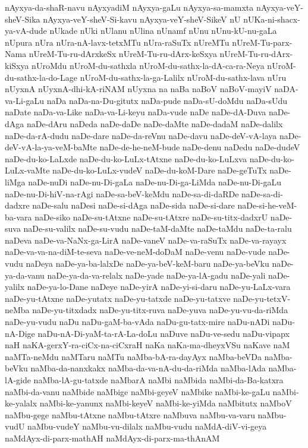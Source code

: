 {nAyxya-da-shaR-navu
nAyxyadiM
nAyxya-gaLu
nAyxya-sa-mamxta
nAyxya-veY-sheV-Sika
nAyxya-veY-sheV-Si-kavu
nAyxya-veY-sheV-SikeV
nU
nUKa-ni-shacx-ya-vA-dude
nUkade
nUki
nUlanu
nUlina
nUnamf
nUnu
nUnu-kU-nu-gaLa
nUpura
nUra
nUra-nA-lavx-tetxMTu
nUra-raSuTx
nUreMTu
nUreM-Tu-parx-Nama
nUreM-Tu-ru-dArxkeSx
nUreM-Tu-ru-dArx-keSxya
nUreM-Tu-ru-dArx-kiSxya
nUroMdu
nUroM-du-sathxla
nUroM-du-sathx-la-dA-ca-ra-Neya
nUroM-du-sathx-la-do-Lage
nUroM-du-sathx-la-ga-Lalilx
nUroM-du-sathx-lava
nUru
nUyxnA
nUyxnA-dhi-kA-riNAM
nUyxna
na
naBa
naBoV
naBoV-mayiV
naDA-va-Li-gaLu
naDa
naDa-na-Du-gitutx
naDa-pude
naDa-sU-doMdu
naDa-sUdu
naDate
naDa-va-Like
naDa-va-Li-keyu
naDa-vude
naDe
naDe-dA-Duva
naDe-dAga
naDe-dAru
naDeda
naDe-daDe
naDe-daMte
naDe-dadaM
naDe-dalilx
naDe-da-rA-dudu
naDe-dare
naDe-da-reVnu
naDe-davu
naDe-deV-vA-laya
naDe-deV-vA-la-ya-veM-baMte
naDe-de-he-neM-bude
naDe-denu
naDedu
naDe-dudeV
naDe-du-ko-LaLxde
naDe-du-ko-LuLx-tAtxne
naDe-du-ko-LuLxva
naDe-du-ko-LuLx-vaMte
naDe-du-ko-LuLx-vudeV
naDe-du-koM-Dare
naDe-geTuTx
naDe-liMga
naDe-nuDi
naDe-nu-Di-gaLa
naDe-nu-Di-ga-LiMda
naDe-nu-Di-gaLu
naDe-nu-Di-hiV-na-rAgi
naDe-sa-beV-keMdu
naDe-sa-di-daRDe
naDe-sa-di-dadxre
naDe-salu
naDesi
naDe-si-dAga
naDe-sida
naDe-si-dare
naDe-si-he-veM-ba-vara
naDe-siko
naDe-su-tAtxne
naDe-su-tAtxre
naDe-su-titx-dadxrU
naDe-suva
naDe-su-valilx
naDe-su-vudu
naDe-taM-daMte
naDe-taMdu
naDe-ta-ralu
naDeva
naDe-va-NaNx-ga-LirA
naDe-vaneV
naDe-va-raSuTx
naDe-va-rayayx
naDe-va-va-na-diM-te-seva
naDe-ve-neM-doDaM
naDe-venu
naDe-vude
naDe-vudu
naDeya
naDe-ya-ba-lalxDe
naDe-ya-beV-keM-baru
naDe-ya-beVku
naDe-ya-da-vanu
naDe-ya-da-va-relalx
naDe-yade
naDe-ya-lA-gadu
naDe-yali
naDe-yalilx
naDe-ya-lo-Dane
naDeye
naDe-yirA
naDe-yi-si-daru
naDe-yu-LaLx-vara
naDe-yu-tAtxne
naDe-yutatx
naDe-yu-tatxde
naDe-yu-tatxve
naDe-yu-tetxV-neMba
naDe-yu-titxdadx
naDe-yu-titx-ruva
naDe-yuva
naDe-yu-vu-da-riMda
naDe-yu-vudu
naDu
naDu-gaM-ba-vAda
naDu-gu-tatx-mire
naDu-nADi
naDu-nA-Dige
naDu-nA-Di-yaM-ta-rA-La-doLu
naDuve
naDu-ve-sedu
naDu-vipapx
naH
naKA-gerxY-ra-ciCx-na-ciCxraH
naKa
naKa-ma-dheyxVSu
naKave
naM
naMTa-neMdu
naMTaru
naMTu
naMba-bA-ra-dayAyx
naMba-beVDa
naMba-beVku
naMba-da-nanxkakx
naMba-da-va-nA-du-da-riMda
naMba-lAda
naMba-lA-gide
naMba-lA-gu-tatxde
naMbarA
naMbi
naMbida
naMbi-da-Ba-katxra
naMbi-da-vanu
naMbide
naMbige
naMbi-geyeV
naMbike
naMbi-ke-gaLu
naMbi-ke-yalalx
naMbi-ke-yanunx
naMbi-keyeV
naMbi-ke-yiMda
naMbitutx
naMboV
naMbu-gege
naMbu-tAtxne
naMbu-tAtxre
naMbuva
naMbu-va-varu
naMbu-vudU
naMbu-vudeY
naMbu-vu-dilalx
naMbu-vudu
naMdA-diV-vi-geya
naMdAyx-di-parx-mathAH
naMdAyx-di-parx-ma-thAnAM
}
